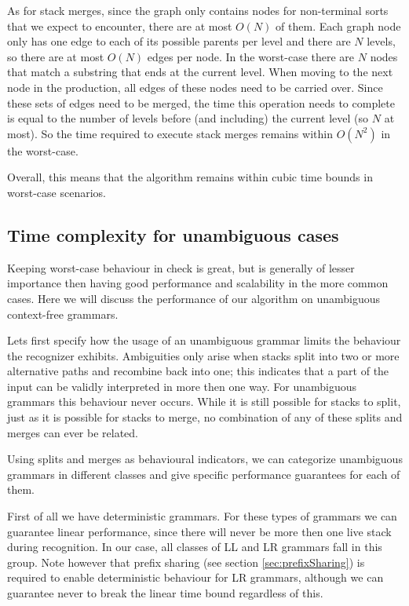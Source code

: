 \documentclass[a4paper,10pt]{article}
\begin{document}
As for stack merges, since the graph only contains nodes for non-terminal sorts that we expect to encounter, there are at most $O(N)$ of them. Each graph node only has one edge to each of its possible parents per level and there are $N$ levels, so there are at most $O(N)$ edges per node. In the worst-case there are $N$ nodes that match a substring that ends at the current level. When moving to the next node in the production, all edges of these nodes need to be carried over. Since these sets of edges need to be merged, the time this operation needs to complete is equal to the number of levels before (and including) the current level (so $N$ at most). So the time required to execute stack merges remains within $O(N^2)$ in the worst-case.

Overall, this means that the algorithm remains within cubic time bounds in worst-case scenarios.

\subsection{Time complexity for unambiguous cases}
\label{subsec:unambiguousTimeComplexity}

Keeping worst-case behaviour in check is great, but is generally of lesser importance then having good performance and scalability in the more common cases. Here we will discuss the performance of our algorithm on unambiguous context-free grammars.

Lets first specify how the usage of an unambiguous grammar limits the behaviour the recognizer exhibits. Ambiguities only arise when stacks split into two or more alternative paths and recombine back into one; this indicates that a part of the input can be validly interpreted in more then one way. For unambiguous grammars this behaviour never occurs. While it is still possible for stacks to split, just as it is possible for stacks to merge, no combination of any of these splits and merges can ever be related.

Using splits and merges as behavioural indicators, we can categorize unambiguous grammars in different classes and give specific performance guarantees for each of them.

First of all we have deterministic grammars. For these types of grammars we can guarantee linear performance, since there will never be more then one live stack during recognition. In our case, all classes of LL and LR grammars fall in this group. Note however that prefix sharing (see section \ref{sec:prefixSharing}) is required to enable deterministic behaviour for LR grammars, although we can guarantee never to break the linear time bound regardless of this.
\end{document}
